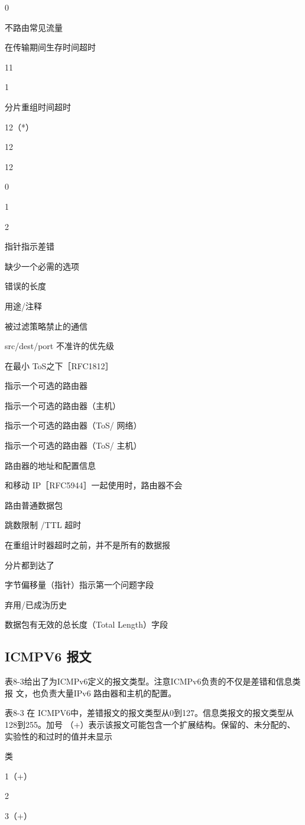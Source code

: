 0

不路由常见流量

在传输期间生存时间超时

11

1

分片重组时间超时

12（*）

12

12

0

1

2

指针指示差错

缺少一个必需的选项

错误的长度

用途/注释

被过滤策略禁止的通信

src/dest/port 不准许的优先级

在最小 ToS之下［RFC1812］

指示一个可选的路由器

指示一个可选的路由器（主机）

指示一个可选的路由器（ToS/ 网络）

指示一个可选的路由器（ToS/ 主机）

路由器的地址和配置信息

和移动 IP［RFC5944］一起使用时，路由器不会

路由普通数据包

跳数限制 /TTL 超时

在重组计时器超时之前，并不是所有的数据报

分片都到达了

字节偏移量（指针）指示第一个问题字段

弃用/已成沩历史

数据包有无效的总长度（Total Length）字段

\subsection{ICMPV6 报文}
表8-3给出了为ICMPv6定义的报文类型。注意ICMPv6负责的不仅是差错和信息类报
文，也负责大量IPv6 路由器和主机的配置。

表8-3 在 ICMPV6中，差错报文的报文类型从0到127。信息类报文的报文类型从 128到255。加号
（+）表示该报文可能包含一个扩展结构。保留的、未分配的、实验性的和过时的值并未显示

类

1（+）

2

3（+）

